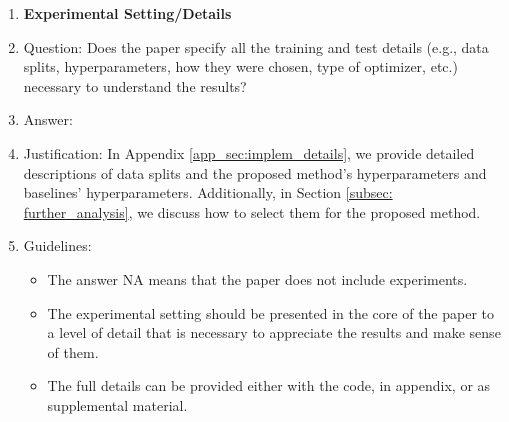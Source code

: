 \documentclass{article}
\begin{document}
\begin{enumerate}
\item {\bf Experimental Setting/Details}
    \item[] Question: Does the paper specify all the training and test details (e.g., data splits, hyperparameters, how they were chosen, type of optimizer, etc.) necessary to understand the results?
    \item[] Answer: \answerYes{} %
    \item[] Justification: In Appendix \ref{app_sec:implem_details}, we provide detailed descriptions of data splits and the proposed method's hyperparameters and baselines' hyperparameters. Additionally, in Section \ref{subsec: further_analysis}, we discuss how to select them for the proposed method.
    \item[] Guidelines:
    \begin{itemize}
        \item The answer NA means that the paper does not include experiments.
        \item The experimental setting should be presented in the core of the paper to a level of detail that is necessary to appreciate the results and make sense of them.
        \item The full details can be provided either with the code, in appendix, or as supplemental material.
    \end{itemize}


\end{enumerate}
\end{document}
